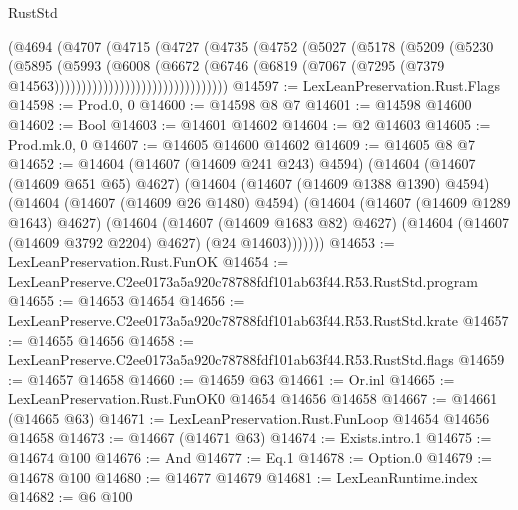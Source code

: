 \begin{lexlean}{RustStd}
\begin{coremodule}
                              (@4694
                                (@4707
                                  (@4715
                                    (@4727
                                      (@4735
                                        (@4752
                                          (@5027
                                            (@5178
                                              (@5209
                                                (@5230
                                                  (@5895
                                                    (@5993
                                                      (@6008
                                                        (@6672
                                                          (@6746
                                                            (@6819
                                                              (@7067
                                                                (@7295
                                                                  (@7379
                                                                    @14563))))))))))))))))))))))))))))))))
@14597 := LexLeanPreservation.Rust.Flags
@14598 := Prod.{0, 0}
@14600 := @14598 @8 @7
@14601 := @14598 @14600
@14602 := Bool
@14603 := @14601 @14602
@14604 := @2 @14603
@14605 := Prod.mk.{0, 0}
@14607 := @14605 @14600 @14602
@14609 := @14605 @8 @7
@14652 := @14604
    (@14607 (@14609 @241 @243) @4594)
    (@14604
      (@14607 (@14609 @651 @65) @4627)
      (@14604
        (@14607 (@14609 @1388 @1390) @4594)
        (@14604
          (@14607 (@14609 @26 @1480) @4594)
          (@14604
            (@14607 (@14609 @1289 @1643) @4627)
            (@14604
              (@14607 (@14609 @1683 @82) @4627)
              (@14604 (@14607 (@14609 @3792 @2204) @4627) (@24 @14603)))))))
@14653 := LexLeanPreservation.Rust.FunOK
@14654 := LexLeanPreserve.C2ee0173a5a920c78788fdf101ab63f44.R53.RustStd.program
@14655 := @14653 @14654
@14656 := LexLeanPreserve.C2ee0173a5a920c78788fdf101ab63f44.R53.RustStd.krate
@14657 := @14655 @14656
@14658 := LexLeanPreserve.C2ee0173a5a920c78788fdf101ab63f44.R53.RustStd.flags
@14659 := @14657 @14658
@14660 := @14659 @63
@14661 := Or.inl
@14665 := LexLeanPreservation.Rust.FunOK0 @14654 @14656 @14658
@14667 := @14661 (@14665 @63)
@14671 := LexLeanPreservation.Rust.FunLoop @14654 @14656 @14658
@14673 := @14667 (@14671 @63)
@14674 := Exists.intro.{1}
@14675 := @14674 @100
@14676 := And
@14677 := Eq.{1}
@14678 := Option.{0}
@14679 := @14678 @100
@14680 := @14677 @14679
@14681 := LexLeanRuntime.index
@14682 := @6 @100

\end{coremodule}
\end{lexlean}

